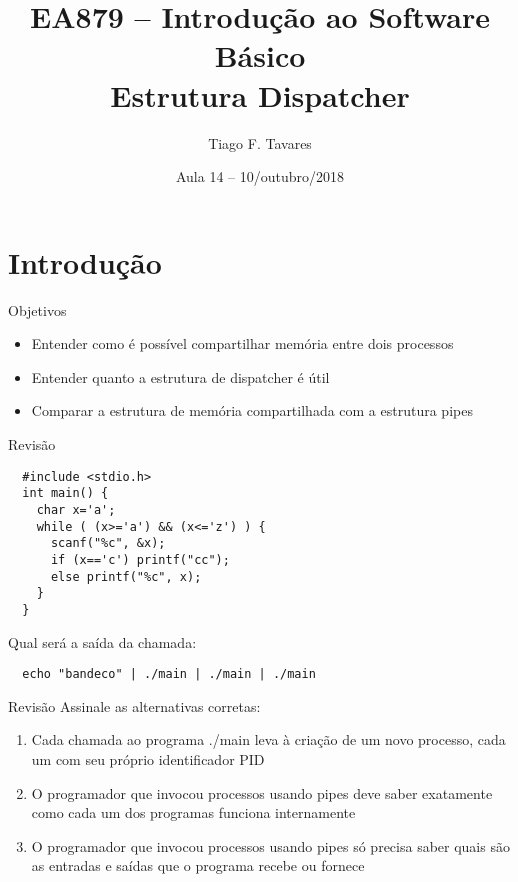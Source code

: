\documentclass{beamer}
\title[14-memshare]{EA879 -- Introdução ao Software
Básico\\Estrutura Dispatcher}
\author{Tiago F. Tavares}
\institute{FEEC -- UNICAMP}
\date{Aula 14 -- 10/outubro/2018}
\begin{document}
\begin{frame}
  \titlepage
\end{frame}


\section{Introdução}

\begin{frame}{Objetivos}
  \Large
  \begin{itemize}
    \item Entender como é possível compartilhar memória entre dois processos
    \item Entender quanto a estrutura de dispatcher é útil
    \item Comparar a estrutura de memória compartilhada com a estrutura pipes
  \end{itemize}
\end{frame}


\begin{frame}[fragile]{Revisão}
  \centering
  \large
  \begin{verbatim}
  #include <stdio.h>
  int main() {
    char x='a';
    while ( (x>='a') && (x<='z') ) {
      scanf("%c", &x);
      if (x=='c') printf("cc");
      else printf("%c", x);
    }
  }
  \end{verbatim}

  Qual será a saída da chamada:
  \begin{verbatim}
  echo "bandeco" | ./main | ./main | ./main
  \end{verbatim}
\end{frame}


\begin{frame}[fragile]{Revisão}
  \centering
  \Large
  Assinale as alternativas corretas:
  \begin{enumerate}
    \item Cada chamada ao programa ./main leva à criação de um novo processo,
      cada um com seu próprio identificador PID
    \item O programador que invocou processos usando pipes deve saber exatamente
      como cada um dos programas funciona internamente
    \item O programador que invocou processos usando pipes só precisa saber
      quais são as entradas e saídas que o programa recebe ou fornece
  \end{enumerate}
\end{frame}
\end{document}
